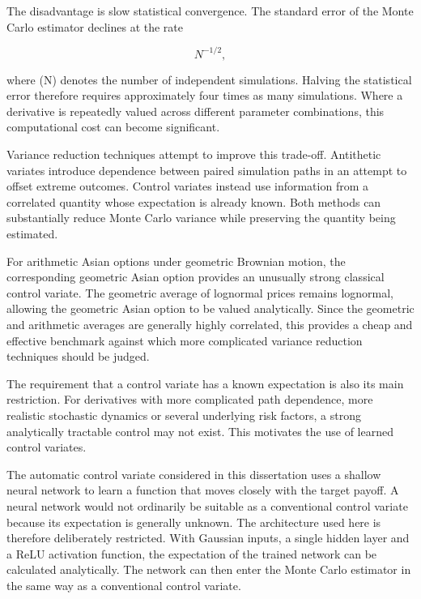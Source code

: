 \documentclass[12pt,a4paper]{report}
\begin{document}
The disadvantage is slow statistical convergence. The standard error of the Monte Carlo estimator declines at the rate

\begin{equation}
N^{-1/2},
\end{equation}

where (N) denotes the number of independent simulations. Halving the statistical error therefore requires approximately four times as many simulations. Where a derivative is repeatedly valued across different parameter combinations, this computational cost can become significant.

Variance reduction techniques attempt to improve this trade-off. Antithetic variates introduce dependence between paired simulation paths in an attempt to offset extreme outcomes. Control variates instead use information from a correlated quantity whose expectation is already known. Both methods can substantially reduce Monte Carlo variance while preserving the quantity being estimated.

For arithmetic Asian options under geometric Brownian motion, the corresponding geometric Asian option provides an unusually strong classical control variate. The geometric average of lognormal prices remains lognormal, allowing the geometric Asian option to be valued analytically. Since the geometric and arithmetic averages are generally highly correlated, this provides a cheap and effective benchmark against which more complicated variance reduction techniques should be judged.

The requirement that a control variate has a known expectation is also its main restriction. For derivatives with more complicated path dependence, more realistic stochastic dynamics or several underlying risk factors, a strong analytically tractable control may not exist. This motivates the use of learned control variates.

The automatic control variate considered in this dissertation uses a shallow neural network to learn a function that moves closely with the target payoff. A neural network would not ordinarily be suitable as a conventional control variate because its expectation is generally unknown. The architecture used here is therefore deliberately restricted. With Gaussian inputs, a single hidden layer and a ReLU activation function, the expectation of the trained network can be calculated analytically. The network can then enter the Monte Carlo estimator in the same way as a conventional control variate.
\end{document}
